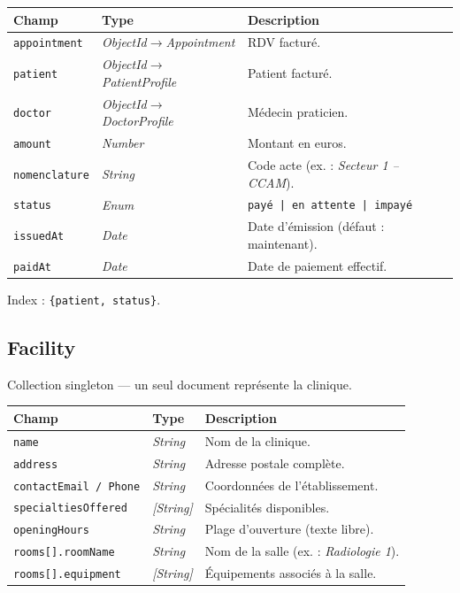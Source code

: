 \documentclass[12pt,a4paper]{report}
\newcommand{\field}[1]{\texttt{\small\textcolor{MedTealDark}{#1}}}
\newcommand{\typ}[1]{\textit{\small\textcolor{CommentGray}{#1}}}
\begin{document}
\begin{center}
\small
\begin{tabularx}{\textwidth}{@{} l l X @{}}
  \toprule
  \textbf{Champ} & \textbf{Type} & \textbf{Description} \\
  \midrule
  \field{appointment} & \typ{ObjectId$\to$Appointment}   & RDV facturé. \\
  \field{patient}     & \typ{ObjectId$\to$PatientProfile} & Patient facturé. \\
  \field{doctor}      & \typ{ObjectId$\to$DoctorProfile}  & Médecin praticien. \\
  \field{amount}      & \typ{Number}                      & Montant en euros. \\
  \field{nomenclature}& \typ{String}                      & Code acte (ex. : \textit{Secteur 1 – CCAM}). \\
  \field{status}      & \typ{Enum}                        & \texttt{payé | en attente | impayé} \\
  \field{issuedAt}    & \typ{Date}                        & Date d'émission (défaut : maintenant). \\
  \field{paidAt}      & \typ{Date}                        & Date de paiement effectif. \\
  \bottomrule
\end{tabularx}
\end{center}

Index : \texttt{\{patient, status\}}.

\subsection{Facility}

Collection singleton — un seul document représente la clinique.

\begin{center}
\small
\begin{tabularx}{\textwidth}{@{} l l X @{}}
  \toprule
  \textbf{Champ} & \textbf{Type} & \textbf{Description} \\
  \midrule
  \field{name}                    & \typ{String}   & Nom de la clinique. \\
  \field{address}                 & \typ{String}   & Adresse postale complète. \\
  \field{contactEmail / Phone}    & \typ{String}   & Coordonnées de l'établissement. \\
  \field{specialtiesOffered}      & \typ{[String]} & Spécialités disponibles. \\
  \field{openingHours}            & \typ{String}   & Plage d'ouverture (texte libre). \\
  \field{rooms[].roomName}        & \typ{String}   & Nom de la salle (ex. : \textit{Radiologie 1}). \\
  \field{rooms[].equipment}       & \typ{[String]} & Équipements associés à la salle. \\
  \bottomrule
\end{tabularx}
\end{center}
\end{document}
